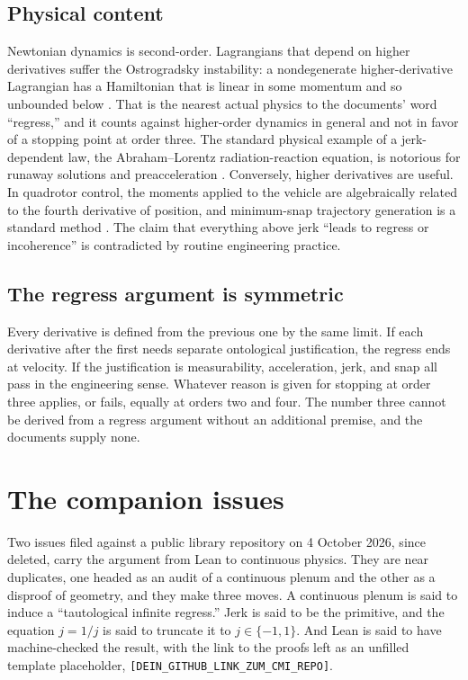 \documentclass[11pt]{article}
\begin{document}
\subsection{Physical content}

Newtonian dynamics is second-order. Lagrangians that depend on higher derivatives suffer the Ostrogradsky instability: a nondegenerate higher-derivative Lagrangian has a Hamiltonian that is linear in some momentum and so unbounded below \cite{ostrogradsky1850,woodard2015}. That is the nearest actual physics to the documents' word ``regress,'' and it counts against higher-order dynamics in general and not in favor of a stopping point at order three. The standard physical example of a jerk-dependent law, the Abraham--Lorentz radiation-reaction equation, is notorious for runaway solutions and preacceleration \cite{jackson1999}. Conversely, higher derivatives are useful. In quadrotor control, the moments applied to the vehicle are algebraically related to the fourth derivative of position, and minimum-snap trajectory generation is a standard method \cite{mellinger2011}. The claim that everything above jerk ``leads to regress or incoherence'' is contradicted by routine engineering practice.

\subsection{The regress argument is symmetric}

Every derivative is defined from the previous one by the same limit. If each derivative after the first needs separate ontological justification, the regress ends at velocity. If the justification is measurability, acceleration, jerk, and snap all pass in the engineering sense. Whatever reason is given for stopping at order three applies, or fails, equally at orders two and four. The number three cannot be derived from a regress argument without an additional premise, and the documents supply none.

\section{The companion issues}
\label{sec:issues}

Two issues filed against a public library repository on 4 October 2026, since deleted, carry the argument from Lean to continuous physics. They are near duplicates, one headed as an audit of a continuous plenum and the other as a disproof of geometry, and they make three moves. A continuous plenum is said to induce a ``tautological infinite regress.'' Jerk is said to be the primitive, and the equation $j = 1/j$ is said to truncate it to $j\in\{-1,1\}$. And Lean is said to have machine-checked the result, with the link to the proofs left as an unfilled template placeholder, \texttt{[DEIN\_GITHUB\_LINK\_ZUM\_CMI\_REPO]}.
\end{document}

